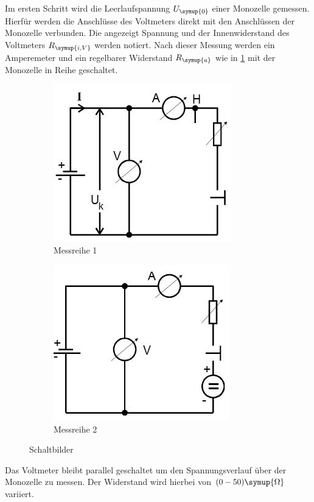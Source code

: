 Im ersten Schritt wird die Leerlaufspannung $U_\symup{0}$ einer Monozelle
gemessen. Hierfür werden die Anschlüsse des Voltmeters direkt mit den Anschlüssen
der Monozelle verbunden. Die angezeigt Spannung und der Innenwiderstand des
Voltmeters $R_\symup{i,V}$ werden notiert.
Nach dieser Messung werden ein Amperemeter und ein regelbarer Widerstand
$R_\symup{a}$ wie in \ref{fig:schlt1} mit der Monozelle in Reihe geschaltet.
\begin{figure}[H]
  \centering
  \begin{subfigure}{0.5\textwidth}
    \centering
    \includegraphics{bilder/sinrecht.jpg}
    \caption{Messreihe 1}
    \label{fig:schlt1}
  \end{subfigure}
  \begin{subfigure}{0.5\textwidth}
    \centering
    \includegraphics{bilder/gegenspannung.jpg}
    \caption{Messreihe 2}
    \label{fig:schlt2}
  \end{subfigure}
  \caption{Schaltbilder \cite{301}}
  \label{fig:schlt}
\end{figure}
Das Voltmeter bleibt parallel geschaltet um den Spannungsverlauf über der
Monozelle zu messen. Der Widerstand wird hierbei von $(0-50)\symup{\si{\ohm}}$
variiert.
